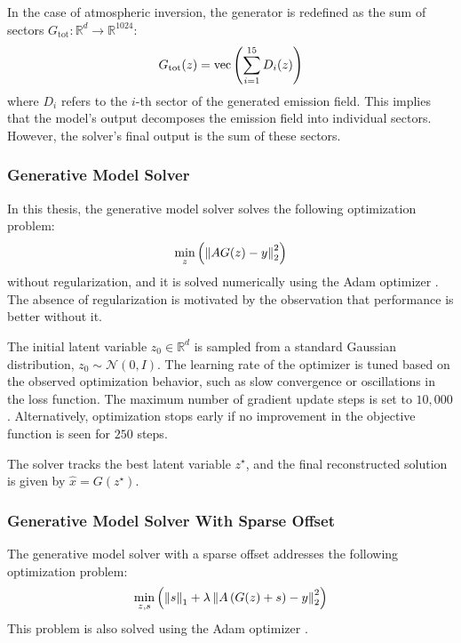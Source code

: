In the case of atmospheric inversion, the generator is redefined as the sum of sectors $G_{\text{tot}}: \mathbb{R}^d \rightarrow \mathbb{R}^{1024}$:
\begin{equation}
    G_{\text{tot}}(z) = \text{vec}\left(\sum_{i = 1}^{15}{D_i(z)}\right)
\end{equation}
where $D_i$ refers to the $i$-th sector of the generated emission field.
This implies that the model's output decomposes the emission field into individual sectors.
However, the solver's final output is the sum of these sectors.

\subsubsection{Generative Model Solver}
In this thesis, the generative model solver solves the following optimization problem:
\begin{equation}
    \min_{z}{\left( \left\lVert A G(z) - y\right\rVert_2^2 \right)}
\end{equation}
without regularization, and it is solved numerically using the Adam optimizer \parencite{Adam}.
The absence of regularization is motivated by the observation that performance is better without it.

The initial latent variable $z_0 \in \mathbb{R}^d$ is sampled from a standard Gaussian distribution, $z_0 \sim \mathcal{N}(0, I)$.
The learning rate of the optimizer is tuned based on the observed optimization behavior, such as slow convergence or oscillations in the loss function. 
The maximum number of gradient update steps is set to $10,000$.
Alternatively, optimization stops early if no improvement in the objective function is seen for $250$ steps.

The solver tracks the best latent variable $z^\star$, and the final reconstructed solution is given by $\hat{x} = G(z^\star)$.

\subsubsection{Generative Model Solver With Sparse Offset}
The generative model solver with a sparse offset addresses the following optimization problem:
\begin{equation}
    \min_{z, s}{\left(\left\lVert s\right\rVert_1 + \lambda \left\lVert A \left( G(z) + s \right) - y\right\rVert_2^2 \right)}
\end{equation}
This problem is also solved using the Adam optimizer \parencite{Adam}.

